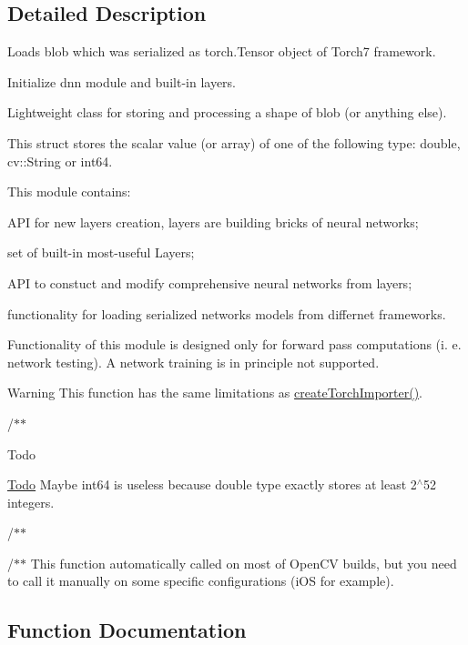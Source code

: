\subsection{Detailed Description}
Loads blob which was serialized as torch.\+Tensor object of Torch7 framework. 

Initialize dnn module and built-\/in layers.

Lightweight class for storing and processing a shape of blob (or anything else).

This struct stores the scalar value (or array) of one of the following type\+: double, cv\+::\+String or int64.

This module contains\+:
\begin{DoxyItemize}
\item A\+PI for new layers creation, layers are building bricks of neural networks;
\item set of built-\/in most-\/useful Layers;
\item A\+PI to constuct and modify comprehensive neural networks from layers;
\item functionality for loading serialized networks models from differnet frameworks. 
\end{DoxyItemize}

Functionality of this module is designed only for forward pass computations (i. e. network testing). A network training is in principle not supported.

\begin{DoxyWarning}{Warning}
This function has the same limitations as \hyperlink{group__dnn_gae0f202e183aadc4ec86abda60b0e6adf}{create\+Torch\+Importer()}.
\end{DoxyWarning}


/$\ast$$\ast$\begin{DoxyRefDesc}{Todo}
\item[\hyperlink{todo__todo000001}{Todo}]Maybe int64 is useless because double type exactly stores at least 2$^\wedge$52 integers. \end{DoxyRefDesc}


/$\ast$$\ast$

/$\ast$$\ast$ This function automatically called on most of Open\+CV builds, but you need to call it manually on some specific configurations (i\+OS for example). 

\subsection{Function Documentation}
\mbox{\label{group__dnn_ga277fa41c30459c131b646bdb8951d82b}} 
